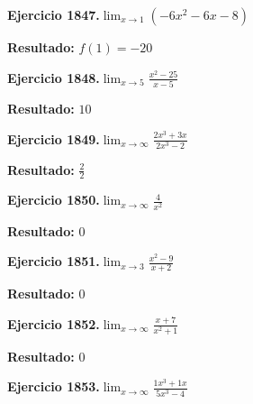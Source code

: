 \documentclass[10pt,a4paper]{article}
\begin{document}
\begin{ejbox}
\textbf{Ejercicio 1847.}\quad $\lim_{x\to 1} (-6x^2 -6x -8)$
\end{ejbox}

\begin{solbox}
\textbf{Resultado:} \(\displaystyle f(1) = -20\)
\end{solbox}

\begin{ejbox}
\textbf{Ejercicio 1848.}\quad $\lim_{x\to 5} \frac{x^2-25}{x-5}$
\end{ejbox}

\begin{solbox}
\textbf{Resultado:} \(\displaystyle 10\)
\end{solbox}

\newpage
\begin{ejbox}
\textbf{Ejercicio 1849.}\quad $\lim_{x\to \infty} \frac{2x^3 + 3x}{2x^3 - 2}$
\end{ejbox}

\begin{solbox}
\textbf{Resultado:} \(\displaystyle \frac{2}{2}\)
\end{solbox}

\begin{ejbox}
\textbf{Ejercicio 1850.}\quad $\lim_{x\to \infty} \frac{4}{x^2}$
\end{ejbox}

\begin{solbox}
\textbf{Resultado:} \(\displaystyle 0\)
\end{solbox}

\begin{ejbox}
\textbf{Ejercicio 1851.}\quad $\lim_{x\to 3} \frac{x^2-9}{x+2}$
\end{ejbox}

\begin{solbox}
\textbf{Resultado:} \(\displaystyle 0\)
\end{solbox}

\newpage
\begin{ejbox}
\textbf{Ejercicio 1852.}\quad $\lim_{x\to \infty} \frac{x + 7}{x^2 + 1}$
\end{ejbox}

\begin{solbox}
\textbf{Resultado:} \(\displaystyle 0\)
\end{solbox}

\begin{ejbox}
\textbf{Ejercicio 1853.}\quad $\lim_{x\to \infty} \frac{1x^3 + 1x}{5x^3 - 4}$
\end{ejbox}
\end{document}
